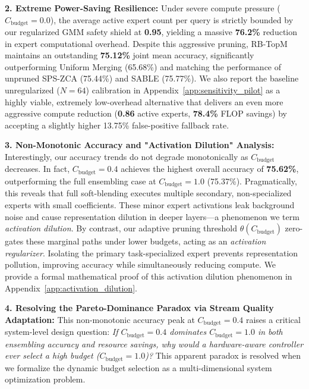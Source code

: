 \textbf{2. Extreme Power-Saving Resilience:} Under severe compute pressure ($C_{\text{budget}} = 0.0$), the average active expert count per query is strictly bounded by our regularized GMM safety shield at \textbf{0.95}, yielding a massive \textbf{76.2\%} reduction in expert computational overhead. Despite this aggressive pruning, RB-TopM maintains an outstanding \textbf{75.12\%} joint mean accuracy, significantly outperforming Uniform Merging (65.68\%) and matching the performance of unpruned SPS-ZCA (75.44\%) and SABLE (75.77\%). We also report the baseline unregularized ($N=64$) calibration in Appendix~\ref{app:sensitivity_pilot} as a highly viable, extremely low-overhead alternative that delivers an even more aggressive compute reduction (\textbf{0.86} active experts, \textbf{78.4\%} FLOP savings) by accepting a slightly higher 13.75\% false-positive fallback rate.

\textbf{3. Non-Monotonic Accuracy and "Activation Dilution" Analysis:} Interestingly, our accuracy trends do not degrade monotonically as $C_{\text{budget}}$ decreases. In fact, $C_{\text{budget}} = 0.4$ achieves the highest overall accuracy of \textbf{75.62\%}, outperforming the full ensembling case at $C_{\text{budget}} = 1.0$ (75.37\%). Pragmatically, this reveals that full soft-blending executes multiple secondary, non-specialized experts with small coefficients. These minor expert activations leak background noise and cause representation dilution in deeper layers—a phenomenon we term \emph{activation dilution}. By contrast, our adaptive pruning threshold $\theta(C_{\text{budget}})$ zero-gates these marginal paths under lower budgets, acting as an \emph{activation regularizer}. Isolating the primary task-specialized expert prevents representation pollution, improving accuracy while simultaneously reducing compute. We provide a formal mathematical proof of this activation dilution phenomenon in Appendix~\ref{app:activation_dilution}.

\textbf{4. Resolving the Pareto-Dominance Paradox via Stream Quality Adaptation:} This non-monotonic accuracy peak at $C_{\text{budget}} = 0.4$ raises a critical system-level design question: \emph{If $C_{\text{budget}} = 0.4$ dominates $C_{\text{budget}} = 1.0$ in both ensembling accuracy and resource savings, why would a hardware-aware controller ever select a high budget ($C_{\text{budget}} = 1.0$)?} This apparent paradox is resolved when we formalize the dynamic budget selection as a multi-dimensional system optimization problem.

